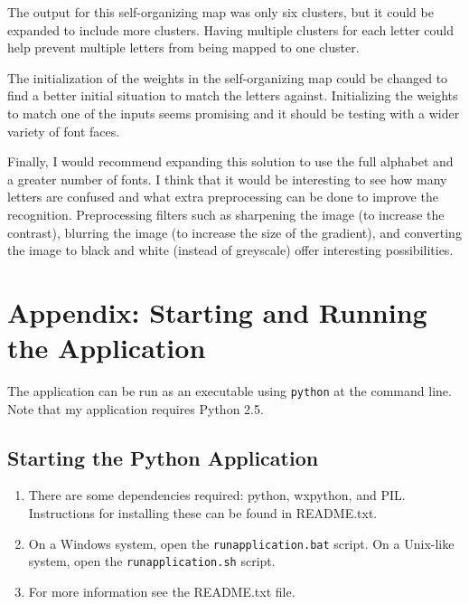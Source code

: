 \documentclass[12pt,letterpaper,oneside]{report}
\newcommand \code[1]{\texttt{#1}}
\begin{document}
The output for this self-organizing map was only six clusters, but it could be expanded to include more clusters. Having multiple clusters for each letter could help prevent multiple letters from being mapped to one cluster.

The initialization of the weights in the self-organizing map could be changed to find a better initial situation to match the letters against. Initializing the weights to match one of the inputs seems promising and it should be testing with a wider variety of font faces.

Finally, I would recommend expanding this solution to use the full alphabet and a greater number of fonts. I think that it would be interesting to see how many letters are confused and what extra preprocessing can be done to improve the recognition. Preprocessing filters such as sharpening the image (to increase the contrast), blurring the image (to increase the size of the gradient), and converting the image to black and white (instead of greyscale) offer interesting possibilities.

\clearpage
\section{Appendix: Starting and Running the Application}\label{apx:running}
The application can be run as an executable using \texttt{python} at the command line.
Note that my application requires Python 2.5.

\subsection{Starting the Python Application}
\begin{enumerate}
  \item There are some dependencies required: python, wxpython, and PIL. Instructions for installing these can be found in README.txt.
  \item On a Windows system, open the \code{runapplication.bat} script. On a
      Unix-like system, open the \code{runapplication.sh} script.
  \item For more information see the README.txt file.
\end{enumerate}

%
\end{document}
